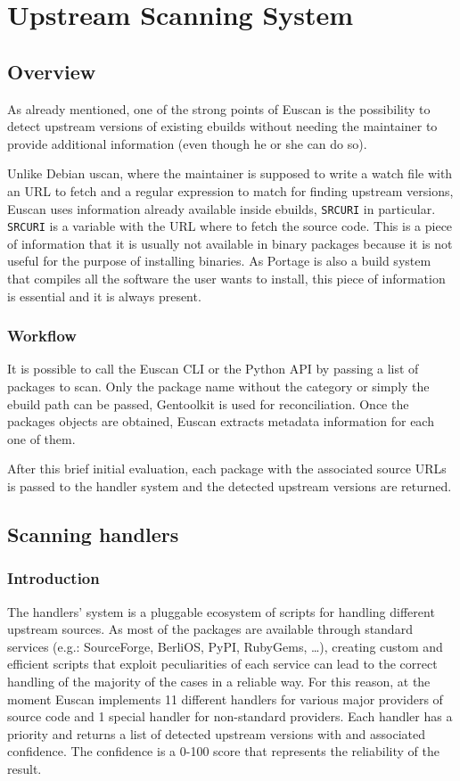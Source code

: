 \chapter{Upstream Scanning System}

\section{Overview}
As already mentioned, one of the strong points of Euscan is the possibility to detect upstream versions of existing ebuilds without needing the maintainer to provide additional information (even though he or she can do so).

Unlike Debian uscan, where the maintainer is supposed to write a watch file with an URL to fetch and a regular expression to match for finding upstream versions, Euscan uses information already available inside ebuilds, \texttt{SRC\textunderscore URI} in particular. \texttt{SRC\textunderscore URI} is a variable with the URL where to fetch the source code. This is a piece of information that it is usually not available in binary packages because it is not useful for the purpose of installing binaries. As Portage is also a build system that compiles all the software the user wants to install, this piece of information is essential and it is always present.

\subsection{Workflow}
It is possible to call the Euscan CLI or the Python API by passing a list of packages to scan. Only the package name without the category or simply the ebuild path can be passed, Gentoolkit is used for reconciliation. Once the packages objects are obtained, Euscan extracts metadata information for each one of them.

After this brief initial evaluation, each package with the associated source URLs is passed to the handler system and the detected upstream versions are returned.


\section{Scanning handlers}
\label{sec:handlers}

\subsection{Introduction}
The handlers' system is a pluggable ecosystem of scripts for handling different upstream sources. As most of the packages are available through standard services (e.g.: SourceForge, BerliOS, PyPI, RubyGems, \ldots), creating custom and efficient scripts that exploit peculiarities of each service can lead to the correct handling of the majority of the cases in a reliable way. For this reason, at the moment Euscan implements 11 different handlers for various major providers of source code and 1 special handler for non-standard providers.
Each handler has a priority and returns a list of detected upstream versions with and associated confidence. The confidence is a 0-100 score that represents the reliability of the result.

